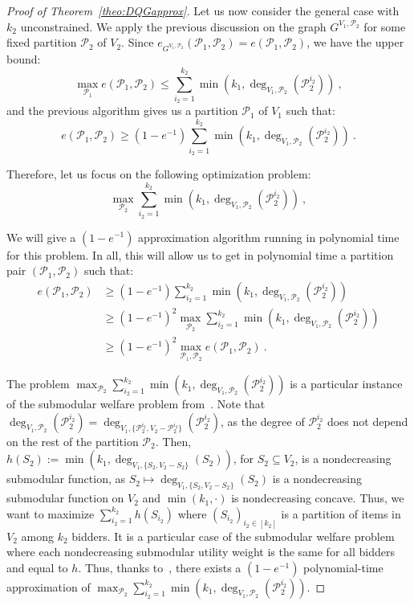 \begin{proof}[Proof of Theorem~\ref{theo:DQGapprox}]
Let us now consider the general case with $k_2$ unconstrained. We apply the previous discussion on the graph $G^{V_1,\mathcal{P}_2}$ for some fixed partition $\mathcal{P}_2$ of $V_2$. Since $e_{G^{V_1,\mathcal{P}_2}}(\mathcal{P}_1,\mathcal{P}_2) = e(\mathcal{P}_1,\mathcal{P}_2)$, we have the upper bound:
\[ \max_{\mathcal{P}_1} e(\mathcal{P}_1,\mathcal{P}_2) \leq \sum_{i_2=1}^{k_2}\min\left(k_1,\deg_{V_1,\mathcal{P}_2}(\mathcal{P}_2^{i_2})\right) \ , \]
and the previous algorithm gives us a partition $\mathcal{P}_1$ of $V_1$ such that:
\[ e(\mathcal{P}_1,\mathcal{P}_2) \geq (1-e^{-1})\sum_{i_2=1}^{k_2}\min\left(k_1,\deg_{V_1,\mathcal{P}_2}(\mathcal{P}_2^{i_2})\right)\ . \]

Therefore, let us focus on the following optimization problem:
\[\max_{\mathcal{P}_2}\sum_{i_2=1}^{k_2}\min\left(k_1,\deg_{V_1,\mathcal{P}_2}(\mathcal{P}_2^{i_2})\right) \ , \]

We will give a $(1-e^{-1})$ approximation algorithm running in polynomial time for this problem. In all, this will allow us to get in polynomial time a partition pair $(\mathcal{P}_1,\mathcal{P}_2)$ such that:
\begin{equation}
  \begin{aligned}
    e(\mathcal{P}_1,\mathcal{P}_2) &\geq (1-e^{-1})\sum_{i_2=1}^{k_2}\min\left(k_1,\deg_{V_1,\mathcal{P}_2}(\mathcal{P}_2^{i_2})\right)\\
    &\geq (1-e^{-1})^2\max_{\mathcal{P}_2}\sum_{i_2=1}^{k_2}\min\left(k_1,\deg_{V_1,\mathcal{P}_2}(\mathcal{P}_2^{i_2})\right)\\
    &\geq (1-e^{-1})^2\max_{\mathcal{P}_1,\mathcal{P}_2} e(\mathcal{P}_1,\mathcal{P}_2) \ .
  \end{aligned}
\end{equation}

The problem $\max_{\mathcal{P}_2}\sum_{i_2=1}^{k_2}\min\left(k_1,\deg_{V_1,\mathcal{P}_2}(\mathcal{P}_2^{i_2})\right)$ is a particular instance of the submodular welfare problem from~\cite{Vondrak08}. Note that $\deg_{V_1,\mathcal{P}_2}(\mathcal{P}_2^{i_2}) = \deg_{V_1,\{\mathcal{P}_2^{i_2}, V_2-\mathcal{P}_2^{i_2}\}}(\mathcal{P}_2^{i_2})$, as the degree of $\mathcal{P}_2^{i_2}$ does not depend on the rest of the partition $\mathcal{P}_2$. Then, $h(S_2) := \min\left(k_1,\deg_{V_1,\{S_2,V_2-S_2\}}(S_2)\right)$, for $S_2 \subseteq V_2$, is a nondecreasing submodular function, as $S_2 \mapsto \deg_{V_1,\{S_2,V_2-S_2\}}(S_2)$ is a nondecreasing submodular function on $V_2$ and $\min(k_1,\cdot)$ is nondecreasing concave. Thus, we want to maximize $\sum_{i_2=1}^{k_2}h(S_{i_2})$ where $(S_{i_2})_{i_2 \in [k_2]}$ is a partition of items in $V_2$ among $k_2$ bidders. It is a particular case of the submodular welfare problem where each nondecreasing submodular utility weight is the same for all bidders and equal to $h$. Thus, thanks to~\cite{Vondrak08}, there exists a $(1-e^{-1})$ polynomial-time approximation of $\max_{\mathcal{P}_2}\sum_{i_2=1}^{k_2}\min\left(k_1,\deg_{V_1,\mathcal{P}_2}(\mathcal{P}_2^{i_2})\right)$.
\end{proof}


